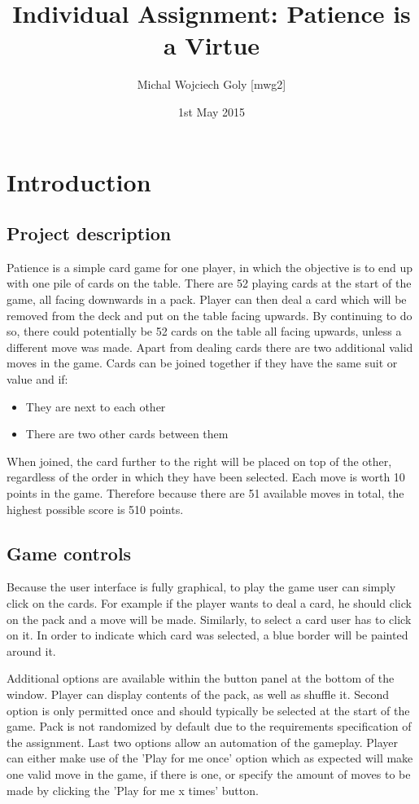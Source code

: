 \documentclass[a4paper, 12pt, titlepage]{article}
\title{Individual Assignment: Patience is a Virtue}
\author{Michal Wojciech Goly [mwg2]}
\date{1st May 2015}
\begin{document}
\maketitle
\tableofcontents
\newpage

\section{Introduction}
\subsection{Project description}
Patience is a simple card game for one player, in which the objective is to end up with 
one pile of cards on the table. There are 52 playing cards at the start of the game, all
facing downwards in a pack. Player can then deal a card which will be removed from the
deck and put on the table facing upwards. By continuing to do so, there could potentially
be 52 cards on the table all facing upwards, unless a different move was made. Apart from
dealing cards there are two additional valid moves in the game. Cards can be joined 
together if they have the same suit or value and if:
\begin{itemize}
	\item They are next to each other
	\item There are two other cards between them
\end{itemize}
When joined, the card further to the right will be placed on top of the other, regardless
of the order in which they have been selected. Each move is worth 10 points in the game. 
Therefore because there are 51 available moves in total, the highest possible score is
510 points. 

\subsection{Game controls} 
Because the user interface is fully graphical, to play the game user can simply click on 
the cards. For example if the player wants to deal a card, he should click on the pack 
and a move will be made. Similarly, to select a card user has to click on it. In order to
indicate which card was selected, a blue border will be painted around it.

Additional options are available within the button panel at the bottom of the window. 
Player can display contents of the pack, as well as shuffle it. Second option is only
permitted once and should typically be selected at the start of the game. Pack is not 
randomized by default due to the requirements specification of the assignment. Last two
options allow an automation of the gameplay. Player can either make use of the 'Play for
me once' option which as expected will make one valid move in the game, if there is one,
or specify the amount of moves to be made by clicking the 'Play for me x times' button.
\end{document}
